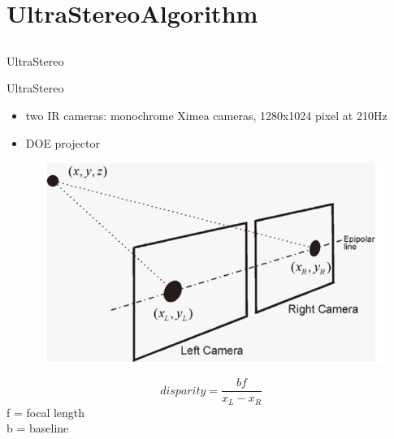 %
%
\section{UltraStereoAlgorithm}
\subsection{}
\begin{frame}{UltraStereo}
\end{frame}

\begin{frame}{UltraStereo}
\begin{itemize}
\item two IR cameras: monochrome Ximea cameras, 1280x1024 pixel at 210Hz
\item DOE projector
\end{itemize}
\end{frame}

\begin{frame}

\begin{figure}
\includegraphics[scale=0.5]{pictures/disp}
\end{figure}
\begin{equation}
disparity = \frac{bf}{x_{L}- x_{R}}
\end{equation}
f = focal length\\
b = baseline
\end{frame}

